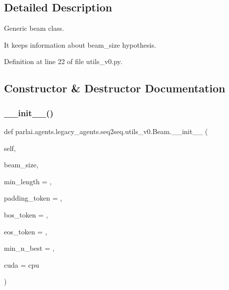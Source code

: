 \subsection{Detailed Description}
\begin{DoxyVerb}Generic beam class.

It keeps information about beam_size hypothesis.
\end{DoxyVerb}
 

Definition at line 22 of file utils\+\_\+v0.\+py.



\subsection{Constructor \& Destructor Documentation}
\mbox{\label{classparlai_1_1agents_1_1legacy__agents_1_1seq2seq_1_1utils__v0_1_1Beam_a0b15ba633165fe8ae84f7664dc893b99}} 
\subsubsection{\texorpdfstring{\+\_\+\+\_\+init\+\_\+\+\_\+()}{\_\_init\_\_()}}
{\footnotesize\ttfamily def parlai.\+agents.\+legacy\+\_\+agents.\+seq2seq.\+utils\+\_\+v0.\+Beam.\+\_\+\+\_\+init\+\_\+\+\_\+ (\begin{DoxyParamCaption}\item[{}]{self,  }\item[{}]{beam\+\_\+size,  }\item[{}]{min\+\_\+length = {},  }\item[{}]{padding\+\_\+token = {},  }\item[{}]{bos\+\_\+token = {},  }\item[{}]{eos\+\_\+token = {},  }\item[{}]{min\+\_\+n\+\_\+best = {},  }\item[{}]{cuda = {\ttfamily \textquotesingle{}cpu\textquotesingle{}} }\end{DoxyParamCaption})}


